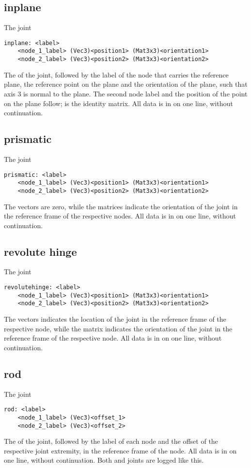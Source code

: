 \subsection{inplane}
The  joint
\begin{verbatim}
inplane: <label>
    <node_1_label> (Vec3)<position1> (Mat3x3)<orientation1>
    <node_2_label> (Vec3)<position2> (Mat3x3)<orientation2>
\end{verbatim}
The  of the joint, followed by the label of the node
that carries the reference plane, the reference point 
on the plane and the orientation  of the plane,
such that axis 3 is normal to the plane.
The second node label and the position of the point on the plane
follow;  is the identity matrix.
All data is in on one line, without continuation.

\subsection{prismatic}
The  joint
\begin{verbatim}
prismatic: <label>
    <node_1_label> (Vec3)<position1> (Mat3x3)<orientation1>
    <node_2_label> (Vec3)<position2> (Mat3x3)<orientation2>
\end{verbatim}
The  vectors are zero,
while the  matrices indicate the orientation 
of the joint in the reference frame of the respective nodes.
All data is in on one line, without continuation.

\subsection{revolute hinge}
The  joint
\begin{verbatim}
revolutehinge: <label>
    <node_1_label> (Vec3)<position1> (Mat3x3)<orientation1>
    <node_2_label> (Vec3)<position2> (Mat3x3)<orientation2>
\end{verbatim}
The  vectors indicates the location of the joint
in the reference frame of the respective node,
while the matrix  indicates the orientation of the joint
in the reference frame of the respective node.
All data is in on one line, without continuation.

\subsection{rod}
The  joint
\begin{verbatim}
rod: <label>
    <node_1_label> (Vec3)<offset_1>
    <node_2_label> (Vec3)<offset_2>
\end{verbatim}
The  of the joint, followed by the label of each node
and the offset of the respective joint extremity,
in the reference frame of the node.
All data is in on one line, without continuation.
Both  and  joints are logged
like this.

